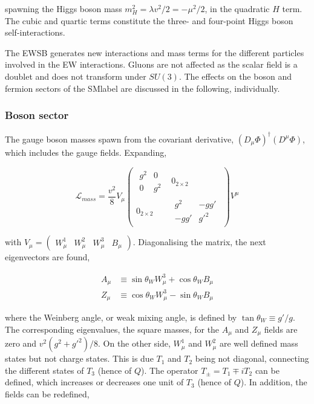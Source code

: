 spawning the Higgs boson mass $m_H^2=\lambda v^2/2 = -\mu^2/2$, in the quadratic $H$ term.
The cubic and quartic terms constitute the three- and four-point Higgs boson self-interactions.

The \acrshort{EWSB} generates new interactions and mass terms for the different particles involved in the \acrshort{EW} interactions.
Gluons are not affected as the scalar field is a doublet and does not transform under $SU(3)$.
The effects on the boson and fermion sectors of the \acrshort{SMlabel} are discussed in the following, individually. 

\subsubsection{Boson sector}

The gauge boson masses spawn from the covariant derivative, $(D_\mu\Phi)^\dag(D^\mu\Phi)$, which includes the gauge fields.
Expanding,

\begin{equation}
\label{Theory_eq:Lgaugemass}
\mathcal{L}_{mass} = \frac{v^2}{8}
V_\mu
\begin{pmatrix} \begin{matrix} g^2 & 0 \\ 0 & g^2 \end{matrix} & 0_{2\times2} \\ 0_{2\times2} & \begin{matrix} g^2 & -gg' \\ -gg' & g'^2 \end{matrix}
\end{pmatrix} V^\mu 
\end{equation}

with $V_\mu = \begin{pmatrix} W_\mu^1 & W_\mu^2 & W_\mu^3 & B_\mu
\end{pmatrix}$. Diagonalising the matrix, the next eigenvectors are found,

\begin{equation}
\begin{split}
    A_\mu &\equiv \sin\theta_W W_\mu^3 + \cos\theta_WB_\mu \\
    Z_\mu &\equiv \cos\theta_W W_\mu^3 - \sin\theta_WB_\mu  
\end{split}
\end{equation}

where the Weinberg angle, or weak mixing angle, is defined by $\tan\theta_W\equiv g'/g$. The corresponding eigenvalues, the square masses, for the $A_\mu$ and $Z_\mu$ fields are zero and $v^2(g^2+g'^2)/8$. On the other side, $W_\mu^1$ and $W_\mu^2$ are well defined mass states but not charge states. This is due $T_1$ and $T_2$ being not diagonal, connecting the different states of $T_3$ (hence of $Q$). The operator $T_\pm=T_1\mp iT_2$ can be defined, which increases or decreases one unit of $T_3$ (hence of $Q$). In addition, the fields can be redefined,

